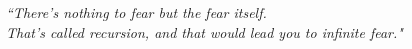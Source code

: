 \begin{dedication}
{\it ``There's nothing to fear but  the fear itself. \\
That's called recursion, and that would lead you to infinite fear."}
\end{dedication}